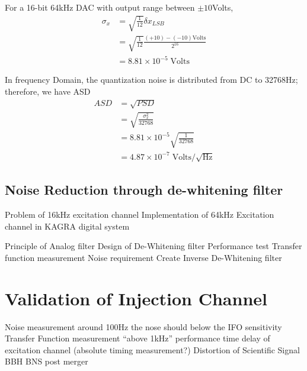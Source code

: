 \documentclass[12pt]{caltech_thesis}
\begin{document}
For a 16-bit 64kHz DAC with output range between $\pm 10$Volts, 
\begin{align}
    \sigma_x &= \sqrt{\frac{1}{12}} \delta x_{LSB} \\
             &= \sqrt{\frac{1}{12}} \frac{(+10)-(-10) \mathrm{Volts}}{2^{16}} \\
             &= 8.81 \times 10^{-5} \;\mathrm{Volts}
\end{align}

In frequency Domain, the quantization noise is distributed from DC to 32768Hz; therefore, we have ASD
\begin{align}
    ASD &= \sqrt{PSD} \\
        &= \sqrt{ \frac{\sigma_x^2}{32768} } \\
        &= 8.81 \times 10^{-5} \sqrt{\frac{1}{32768}} \\
        &= 4.87 \times 10^{-7} \;\mathrm{Volts}/\sqrt{\mathrm{Hz}} 
\end{align}





\section{Noise Reduction through de-whitening filter}
Problem of 16kHz excitation channel 
Implementation of 64kHz Excitation channel in KAGRA digital system

Principle of Analog filter
Design of De-Whitening filter
Performance test
Transfer function measurement 
Noise requirement
Create Inverse De-Whitening filter


\chapter{Validation of Injection Channel}
Noise measurement
around 100Hz  the nose should below the IFO sensitivity
Transfer Function measurement
“above 1kHz” performance
time delay of excitation channel
(absolute timing measurement?)
Distortion of Scientific Signal
BBH
BNS post merger
\end{document}
